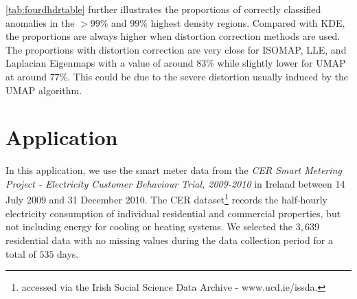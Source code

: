 \documentclass[12pt]{article}
\begin{document}
\begin{table}

\caption{\label{tab:fourdhdrtable}Proportion comparison of outliers in correct highest density regions in density estimation of four manifold learning embeddings for the 100-D data.}
\centering
{}
\end{table}

\autoref{tab:fourdhdrtable} further illustrates the proportions of correctly classified anomalies in the \(>99\%\) and \(99\%\) highest density regions. Compared with KDE, the proportions are always higher when distortion correction methods are used. The proportions with distortion correction are very close for ISOMAP, LLE, and Laplacian Eigenmaps with a value of around \(83\%\) while slightly lower for UMAP at around \(77\%\). This could be due to the severe distortion usually induced by the UMAP algorithm.

\hypertarget{dckdeapplication}{%
\section{Application}\label{dckdeapplication}}

In this application, we use the smart meter data from the \emph{CER Smart Metering Project - Electricity Customer Behaviour Trial, 2009-2010} in Ireland \autocite{cer2012-data} between 14 July 2009 and 31 December 2010. The CER dataset\footnote{accessed via the Irish Social Science Data Archive - www.ucd.ie/issda.} records the half-hourly electricity consumption of individual residential and commercial properties, but not including energy for cooling or heating systems. We selected the \(3,639\) residential data with no missing values during the data collection period for a total of \(535\) days.
\end{document}
